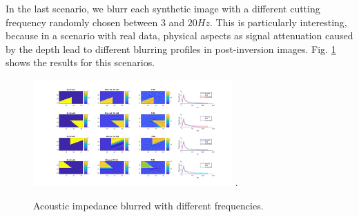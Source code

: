 \documentclass[conference,compsoc]{IEEEtran}
\begin{document}
In the last scenario, we blurr each synthetic image with a different
cutting frequency randomly chosen between $3$ and $20 Hz$. This is particularly interesting, because
in a scenario with real data, physical aspects as signal attenuation caused by the depth lead to
different blurring profiles in post-inversion images.
Fig. \ref{fig_scenario5} shows the results for this scenarios.
\begin{figure}[!t]
\centering
\includegraphics[width=3.0in]{Figs/Caso5}
\DeclareGraphicsExtensions.
\caption{Acoustic impedance blurred with different frequencies.}
\label{fig_scenario5}
\end{figure}
\end{document}
